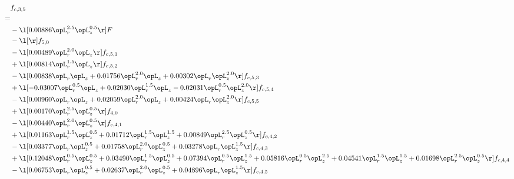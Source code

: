 \begin{alignat}{2} 
\label{eq:f_35_2} 
& f_{c,3,5} \nonumber \\ 
 = \\ 
& - \l[  0.00886 \opL_r^{2.5} \opL_z^{0.5}  \r] F \nonumber \\ 
& - \l[  \r] f_{5,0} \nonumber \\ 
& - \l[  0.00489 \opL_r^{2.0} \opL_z  \r] f_{c,5,1} \nonumber \\ 
& + \l[  0.00814 \opL_r^{1.5} \opL_z  \r] f_{c,5,2} \nonumber \\ 
& - \l[  0.00838 \opL_r \opL_z +  0.01756 \opL_r^{2.0} \opL_z +  0.00302 \opL_r \opL_z^{2.0}  \r] f_{c,5,3} \nonumber \\ 
& + \l[  -0.03007 \opL_r^{0.5} \opL_z +  0.02030 \opL_r^{1.5} \opL_z   -0.02031 \opL_r^{0.5} \opL_z^{2.0}  \r] f_{c,5,4} \nonumber \\ 
& - \l[  0.00960 \opL_r \opL_z +  0.02059 \opL_r^{2.0} \opL_z +  0.00424 \opL_r \opL_z^{2.0}  \r] f_{c,5,5} \nonumber \\ 
& + \l[  0.00170 \opL_r^{2.5} \opL_z^{0.5}  \r] f_{4,0} \nonumber \\ 
& - \l[  0.00440 \opL_r^{2.0} \opL_z^{0.5}  \r] f_{c,4,1} \nonumber \\ 
& + \l[  0.01163 \opL_r^{1.5} \opL_z^{0.5} +  0.01712 \opL_r^{1.5} \opL_z^{1.5} +  0.00849 \opL_r^{2.5} \opL_z^{0.5}  \r] f_{c,4,2} \nonumber \\ 
& - \l[  0.03377 \opL_r \opL_z^{0.5} +  0.01758 \opL_r^{2.0} \opL_z^{0.5} +  0.03278 \opL_r \opL_z^{1.5}  \r] f_{c,4,3} \nonumber \\ 
& + \l[  0.12048 \opL_r^{0.5} \opL_z^{0.5} +  0.03490 \opL_r^{1.5} \opL_z^{0.5} +  0.07394 \opL_r^{0.5} \opL_z^{1.5} +  0.05816 \opL_r^{0.5} \opL_z^{2.5} +  0.04541 \opL_r^{1.5} \opL_z^{1.5} +  0.01698 \opL_r^{2.5} \opL_z^{0.5}  \r] f_{c,4,4} \nonumber \\ 
& - \l[  0.06753 \opL_r \opL_z^{0.5} +  0.02637 \opL_r^{2.0} \opL_z^{0.5} +  0.04896 \opL_r \opL_z^{1.5}  \r] f_{c,4,5} \nonumber \\ 
\end{alignat} 


